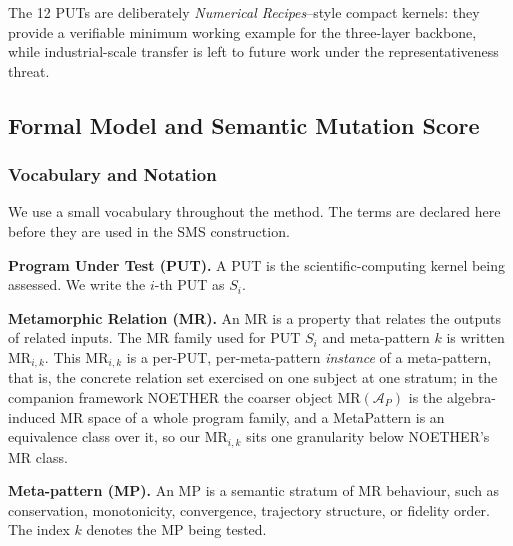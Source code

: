 \documentclass[manuscript,screen,review]{acmart}
\begin{document}
The 12 PUTs are deliberately \emph{Numerical Recipes}--style compact
kernels: they provide a verifiable minimum working example for the
three-layer backbone, while industrial-scale transfer is left to future
work under the representativeness threat.


\subsection{Formal Model and Semantic Mutation Score}\label{notation-and-equivalence-judgement}

\subsubsection{Vocabulary and Notation}\label{vocabulary-inheritance}

We use a small vocabulary throughout the method. The terms are declared
here before they are used in the SMS construction.

\textbf{Program Under Test (PUT).} A PUT is the scientific-computing
kernel being assessed. We write the \(i\)-th PUT as \(S_i\).

\textbf{Metamorphic Relation (MR).} An MR is a property that relates the
outputs of related inputs. The MR family used for PUT \(S_i\) and
meta-pattern \(k\) is written \(\mathrm{MR}_{i,k}\). This
\(\mathrm{MR}_{i,k}\) is a per-PUT, per-meta-pattern \emph{instance} of a
meta-pattern, that is, the concrete relation set exercised on one subject at
one stratum; in the companion framework NOETHER \citep{noether2026} the
coarser object \(\mathrm{MR}(\mathcal{A}_P)\) is the algebra-induced MR space
of a whole program family, and a MetaPattern is an equivalence class over it,
so our \(\mathrm{MR}_{i,k}\) sits one granularity below NOETHER's MR class.

\textbf{Meta-pattern (MP).} An MP is a semantic stratum of MR behaviour,
such as conservation, monotonicity, convergence, trajectory structure, or
fidelity order. The index \(k\) denotes the MP being tested.
\end{document}
